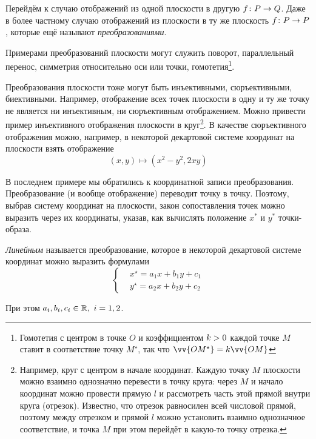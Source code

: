 \documentclass[a4paper,12pt]{article}
\begin{document}
  Перейдём к случаю отображений из одной плоскости в другую $f\colon P \hm\to Q$.
  Даже в более частному случаю отображений из плоскости в ту же плоскость $f\colon P \hm\to P$, которые ещё называют \emph{преобразованиями}.
  
  Примерами преобразований плоскости могут служить поворот, параллельный перенос, симметрия относительно оси или точки, гомотетия\footnote{Гомотетия с центром в точке $O$ и коэффициентом $k \hm> 0 $ каждой точке $M$ ставит в соответствие точку $M^\star$, так что $\vv{OM^\star} \hm= k\vv{OM}$}.
  
  Преобразования плоскости тоже могут быть инъективными, сюръективными, биективными.
  Например, отображение всех точек плоскости в одну и ту же точку не является ни инъективным, ни сюръективным отображением.
  Можно привести пример инъективного отображения плоскости в круг\footnote{
    Например, круг с центром в начале координат.
    Каждую точку $M$ плоскости можно взаимно однозначно перевести в точку круга: через $M$ и начало координат можно провести прямую $l$ и рассмотреть часть этой прямой внутри круга (отрезок).
    Известно, что отрезок равносилен всей числовой прямой, поэтому между отрезком и прямой $l$ можно установить взаимно однозначное соответствие, и точка $M$ при этом перейдёт в какую-то точку отрезка.
  }.
  В качестве сюръективного отображения можно, например, в некоторой декартовой системе координат на плоскости взять отображение
  \[
    (x, y) \mapsto \left(x^2 - y^2, 2xy\right)
  \]
  
  В последнем примере мы обратились к координатной записи преобразования.
  Преобразование (и вообще отображение) переводит точку в точку.
  Поэтому, выбрав систему координат на плоскости, закон сопоставления точек можно выразить через их координаты, указав, как вычислять положение $x^*$ и $y^*$ точки-образа.
  
  \begin{definition}
    \emph{Линейным} называется преобразование, которое в некоторой декартовой системе координат можно выразить формулами
    \begin{equation}
      \label{eq:linear}
      \left\{
        \begin{aligned}
          &x^\star = a_1 x + b_1 y + c_1\\
          &y^\star = a_2 x + b_2 y + c_2
        \end{aligned}
      \right.
    \end{equation}
    
    При этом $a_i, b_i, c_i \hm\in \RR,\ i = 1, 2$.
  \end{definition}
  
\end{document}
